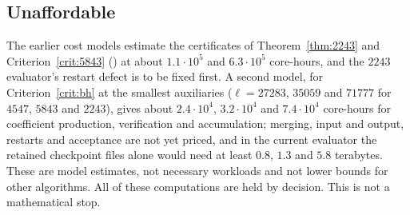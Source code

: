 \subsection{Unaffordable}
The earlier cost models estimate the certificates of Theorem~\ref{thm:2243} and Criterion~\ref{crit:5843} () at about $1.1\cdot10^5$ and $6.3\cdot10^5$ core-hours, and the $2243$ evaluator's restart defect is to be fixed first. A second model, for Criterion~\ref{crit:bh} at the smallest auxiliaries ($\ell=27283$, $35059$ and $71777$ for $4547$, $5843$ and $2243$), gives about $2.4\cdot10^4$, $3.2\cdot10^4$ and $7.4\cdot10^4$ core-hours for coefficient production, verification and accumulation; merging, input and output, restarts and acceptance are not yet priced, and in the current evaluator the retained checkpoint files alone would need at least $0.8$, $1.3$ and $5.8$ terabytes. These are model estimates, not necessary workloads and not lower bounds for other algorithms. All of these computations are held by decision. This is not a mathematical stop.
